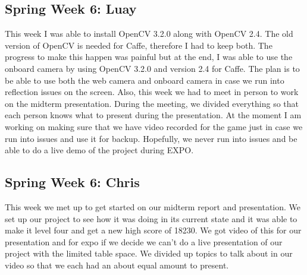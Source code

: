 \documentclass[onecolumn, draftclsnofoot,10pt, compsoc]{IEEEtran}
\begin{document}
\subsection{Spring Week 6: Luay}
This week I was able to install OpenCV 3.2.0 along with OpenCV 2.4. The old version of OpenCV is needed for Caffe, therefore I had to keep both. The progress to make this happen was painful but at the end, I was able to use the onboard camera by using OpenCV 3.2.0 and version 2.4 for Caffe. The plan is to be able to use both the web camera and onboard camera in case we run into reflection issues on the screen. Also, this week we had to meet in person to work on the midterm presentation. During the meeting, we divided everything so that each person knows what to present during the presentation. At the moment I am working on making sure that we have video recorded for the game just in case we run into issues and use it for backup. Hopefully, we never run into issues and be able to do a live demo of the project during EXPO.
\subsection{Spring Week 6: Chris}
This week we met up to get started on our midterm report and presentation. We set up our project to see how it was doing in its current state and it was able to make it level four and get a new high score of 18230. We got video of this for our presentation and for expo if we decide we can't do a live presentation of our project with the limited table space. We divided up topics to talk about in our video so that we each had an about equal amount to present.
\end{document}
